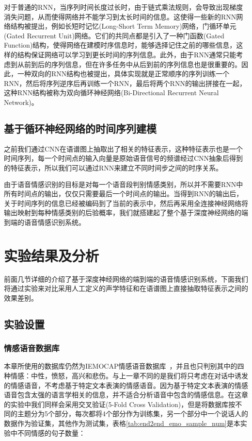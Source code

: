 对于普通的RNN，当序列时间长度过长时，由于链式乘法规则，会导致出现梯度消失问题，从而使得网络并不能学习到太长时间的信息。这使得一些新的RNN网络结构被提出，例如长短时记忆(Long-Short Term Memory)网络，门循环单元(Gated Recurrent Unit)网络。它们的共同点都是引入了一种门函数(Gated Function)结构，使得网络在建模时序信息时，能够选择记住之前的哪些信息，这样的结构保证网络可以学习到更长时间的序列信息。此外，由于RNN通常只能考虑到从前到后的序列信息，但在许多任务中从后到前的序列信息也是很重要的。因此，一种双向的RNN结构也被提出，具体实现就是正常顺序的序列训练一个RNN，然后将序列逆序后再训练一个RNN，最后将两个RNN的输出拼接在一起，这种RNN结构被称为双向循环神经网络(Bi-Directional Recurrent Neural Network)。

\subsection{基于循环神经网络的时间序列建模}
\label{ssec:rnn_seq_model_detail}

之前我们通过CNN在语谱图上抽取出了相关的特征表示，这种特征表示也是一个时间序列，每一个时间点的输入向量是原始语音信号的频谱经过CNN抽象后得到的特征表示，所以我们可以通过RNN来建立不同时间步之间的时序关系。

由于语音情感识别的目标是对每一个语音段判别情感类别，所以并不需要RNN中所有时间点的输出，仅仅只需要最后一个时间点的输出。当得到RNN的输出后，关于时间序列的信息已经被编码到了当前的表示中，然后再采用全连接神经网络将输出映射到每种情感类别的后验概率，我们就搭建起了整个基于深度神经网络的端到端的语音情感识别系统。


\section{实验结果及分析}
\label{sec:end2end_experiment}

前面几节详细的介绍了基于深度神经网络的端到端的语音情感识别系统，下面我们将通过实验来对比采用人工定义的声学特征和在语谱图上直接抽取特征表示之间的效果差别。

\subsection{实验设置}
\label{ssec:end2end_experiment_setup}

\subsubsection{情感语音数据库}
\label{ssec:end2end_database}

本章所使用的数据库仍然为IEMOCAP情感语音数据库~\cite{Busso2008IEMOCAP}，并且也只判别其中的四种情感：中性，愤怒，高兴和悲伤。与上一章不同的是我们将只考虑在对话中诱发的情感语音，不考虑基于特定文本表演的情感语音。因为基于特定文本表演的情感语音包含太强的语言学相关的信息，并不适合分析语音中包含的情感信息。在这章的实验中我们同样会采用交叉验证(5-Fold Cross Validation)，但是将数据库按不同的主题分为5个部分，每次都将4个部分作为训练集，另一个部分中一个说话人的数据作为验证集，其他作为测试集，表格\ref{tab:end2end_emo_sample_num}是本实验中不同情感的句子数量：

